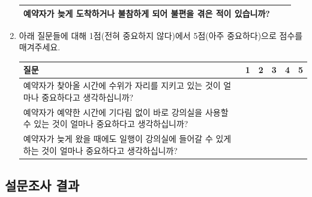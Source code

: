 \documentclass[11pt,a4paper]{article}
\begin{document}
\begin{enumerate}
\begin{tabular}{ | l | c | c | }
\hline
예약자가 늦게 도착하거나 불참하게 되어 불편을 겪은 적이 있습니까? & & \\
\hline
\end{tabular}
\item 아래 질문들에 대해 1점(전혀 중요하지 않다)에서 5점(아주 중요하다)으로 점수를 매겨주세요.\\
\begin{tabular}{ | p{12cm} | c | c | c | c | c | }
\hline
질문 & 1 & 2 & 3 & 4 & 5 \\
\hline
예약자가 찾아올 시간에 수위가 자리를 지키고 있는 것이 얼마나 중요하다고 생각하십니까? & & & & & \\
\hline
예약자가 예약한 시간에 기다림 없이 바로 강의실을 사용할 수 있는 것이 얼마나 중요하다고 생각하십니까? & & & & & \\
\hline
예약자가 늦게 왔을 때에도 일행이 강의실에 들어갈 수 있게 하는 것이 얼마나 중요하다고 생각하십니까? & & & & & \\
\hline
\end{tabular}
\end{enumerate}
\subsection{설문조사 결과}
\end{document}
